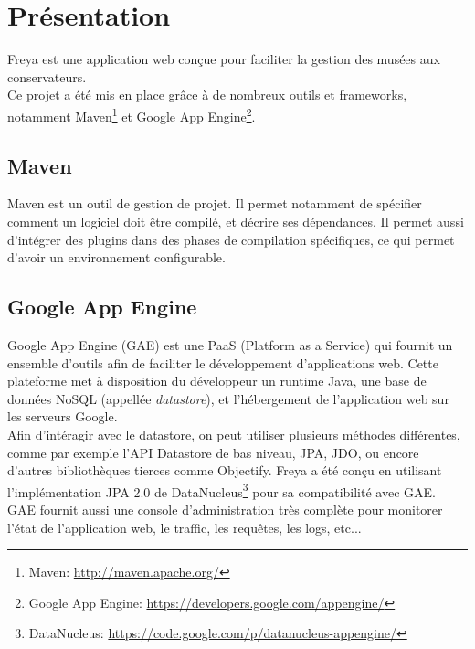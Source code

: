 \chapter{Présentation}
Freya est une application web conçue pour faciliter la gestion des musées aux
conservateurs.\\
Ce projet a été mis en place grâce à de nombreux outils et frameworks, notamment
Maven\footnote{Maven: \url{http://maven.apache.org/}} et Google App
Engine\footnote{Google App Engine:
\url{https://developers.google.com/appengine/}}.


\section{Maven}
Maven est un outil de gestion de projet. Il permet notamment de spécifier
comment un logiciel doit être compilé, et décrire ses dépendances. Il permet
aussi d’intégrer des plugins dans des phases de compilation spécifiques, ce qui
permet d’avoir un environnement configurable.

\section{Google App Engine}
Google App Engine (GAE) est une PaaS (Platform as a Service) qui fournit un
ensemble d’outils afin de faciliter le développement d’applications web. Cette
plateforme met à disposition du développeur un runtime Java, une base de données
NoSQL (appellée \emph{datastore}), et l’hébergement de l’application web sur les
serveurs Google.\\

Afin d’intéragir avec le datastore, on peut utiliser plusieurs méthodes
différentes, comme par exemple l’API Datastore de bas niveau, JPA, JDO, ou
encore d’autres bibliothèques tierces comme Objectify.
Freya a été conçu en utilisant l’implémentation JPA 2.0 de
DataNucleus\footnote{DataNucleus:
\url{https://code.google.com/p/datanucleus-appengine/}} pour sa compatibilité avec GAE.\\

GAE fournit aussi une console d’administration très complète pour monitorer
l’état de l’application web, le traffic, les requêtes, les logs, etc...
